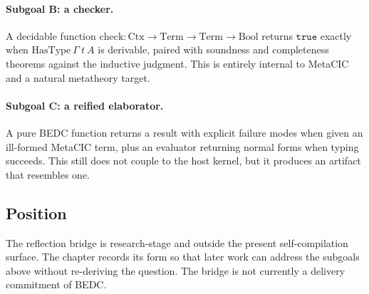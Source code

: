 \paragraph{Subgoal B: a checker.} A decidable function
$\mathrm{check} : \mathrm{Ctx} \to \mathrm{Term} \to \mathrm{Term}
\to \mathrm{Bool}$ returns $\mathtt{true}$ exactly when
$\mathrm{HasType}\ \Gamma\ t\ A$ is derivable, paired with soundness and
completeness theorems against the inductive judgment. This is entirely internal
to MetaCIC and a natural metatheory target.

\paragraph{Subgoal C: a reified elaborator.} A pure BEDC function returns a
result with explicit failure modes when given an ill-formed MetaCIC term, plus
an evaluator returning normal forms when typing succeeds. This still does not
couple to the host kernel, but it produces an artifact that resembles one.

\subsection{Position}\label{subsec:bridge-position}

The reflection bridge is research-stage and outside the present
self-compilation surface. The chapter records its form so that later work can
address the subgoals above without re-deriving the question. The bridge is not
currently a delivery commitment of BEDC.
